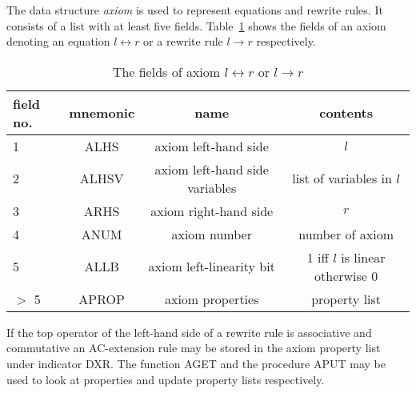 The data structure {\em axiom} is used to represent equations and rewrite rules.
It consists of a list with at least five fields.
Table~\ref{tb:ax} shows the fields of an axiom denoting an equation
$ l \leftrightarrow r$ or a rewrite rule $ l \rightarrow r$ respectively.
\begin{table}
\begin{center}
\begin{tabular}{|l|c|c|c|}
 \hline
 field no. & mnemonic & name & contents \\
 \hline\hline
 1 &  ALHS & axiom left-hand side & $l$ \\
 \hline
 2 & ALHSV & axiom left-hand side variables & list of variables in $l$  \\
 \hline
 3 & ARHS & axiom right-hand side & $r$ \\
 \hline
 4 & ANUM & axiom number & number of axiom  \\
 \hline
 5 & ALLB & axiom left-linearity bit & 1 iff $l$ is linear otherwise 0  \\
 \hline
 $>$ 5 & APROP & axiom properties & property list \\
 \hline
\end{tabular}
\caption{The fields of axiom $ l \leftrightarrow r$ or $ l \rightarrow r$} \label{tb:ax}
\end{center}
\end{table}
If the top operator of the left-hand side of a rewrite rule is associative
and commutative an AC-extension rule \cite{PetersonStickel:81} may
be stored in the axiom property list under indicator DXR.
The function AGET and the procedure APUT may be used to look at properties
and update property lists respectively.

